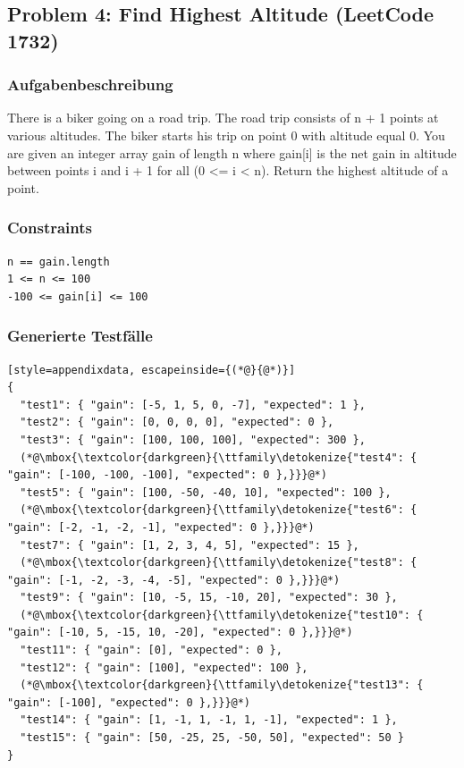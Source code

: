 \clearpage

\subsection{Problem 4: Find Highest Altitude (LeetCode 1732)}

\subsubsection*{Aufgabenbeschreibung}
There is a biker going on a road trip. The road trip consists of n + 1 points at various altitudes. The biker starts his trip on point 0 with altitude equal 0.
You are given an integer array gain of length n where gain[i] is the net gain in altitude between points i and i + 1 for all (0 <= i < n). Return the highest altitude of a point.

\subsubsection*{Constraints}
\begin{lstlisting}[style=appendixdata]
n == gain.length
1 <= n <= 100
-100 <= gain[i] <= 100
\end{lstlisting}

\subsubsection*{Generierte Testfälle}
\begin{lstlisting}[style=appendixdata, escapeinside={(*@}{@*)}]
{
  "test1": { "gain": [-5, 1, 5, 0, -7], "expected": 1 },
  "test2": { "gain": [0, 0, 0, 0], "expected": 0 },
  "test3": { "gain": [100, 100, 100], "expected": 300 },
  (*@\mbox{\textcolor{darkgreen}{\ttfamily\detokenize{"test4": { "gain": [-100, -100, -100], "expected": 0 },}}}@*)
  "test5": { "gain": [100, -50, -40, 10], "expected": 100 },
  (*@\mbox{\textcolor{darkgreen}{\ttfamily\detokenize{"test6": { "gain": [-2, -1, -2, -1], "expected": 0 },}}}@*)
  "test7": { "gain": [1, 2, 3, 4, 5], "expected": 15 },
  (*@\mbox{\textcolor{darkgreen}{\ttfamily\detokenize{"test8": { "gain": [-1, -2, -3, -4, -5], "expected": 0 },}}}@*)
  "test9": { "gain": [10, -5, 15, -10, 20], "expected": 30 },
  (*@\mbox{\textcolor{darkgreen}{\ttfamily\detokenize{"test10": { "gain": [-10, 5, -15, 10, -20], "expected": 0 },}}}@*)
  "test11": { "gain": [0], "expected": 0 },
  "test12": { "gain": [100], "expected": 100 },
  (*@\mbox{\textcolor{darkgreen}{\ttfamily\detokenize{"test13": { "gain": [-100], "expected": 0 },}}}@*)
  "test14": { "gain": [1, -1, 1, -1, 1, -1], "expected": 1 },
  "test15": { "gain": [50, -25, 25, -50, 50], "expected": 50 }
}
\end{lstlisting}

